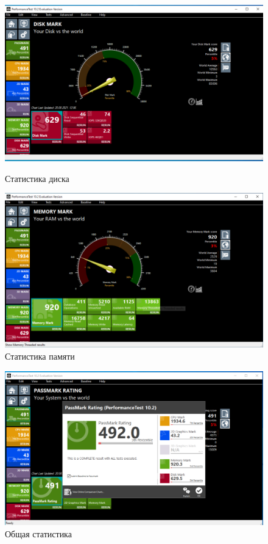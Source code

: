 \documentclass[a4paper,14pt]{extarticle}
\begin{document}
\begin{figure}[h!]
	\centering
	\begin{minipage}[h]{0.48\linewidth}
		\includegraphics[width=1\linewidth]{images/disc-stat}
		\caption{Статистика диска}
		\label{fig:disc-stat}
	\end{minipage}
	\hfill
	\begin{minipage}[h]{0.48\linewidth}
	\includegraphics[width=1\linewidth]{images/memory-stat}
	\caption{Статистика памяти}
	\label{fig:memory-stat}
	\end{minipage}
\end{figure}

\begin{figure}[h!]
\centering
\includegraphics[width=0.6\linewidth]{images/total}
\caption{Общая статистика}
\label{fig:total}
\end{figure}
\newpage
\end{document}
